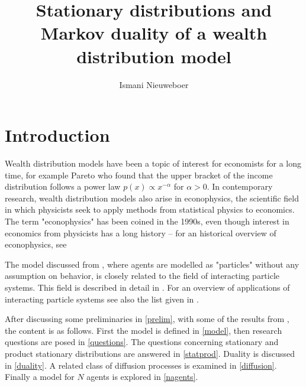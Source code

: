 \documentclass{article}
\title{Stationary distributions and Markov duality of a wealth distribution model}
\author{Ismani Nieuweboer}
\begin{document}
\maketitle













\section*{Introduction}
Wealth distribution models have been a topic of interest for economists for a long time, for example Pareto who found that the upper bracket of the income distribution follows a power law $p(x) \propto x^{-\alpha}$ for $\alpha > 0$. In contemporary research, wealth distribution models also arise in econophysics, the scientific field in which physicists seek to apply methods from statistical physics to economics. The term "econophysics" has been coined in the 1990s, even though interest in economics from physicists has a long history -- for an historical overview of econophysics, see \cite{2008arXiv0802.1416D, 2011arXiv1108.0977S}

The model discussed from \cite{cirillo2014duality}, where agents are modelled as "particles" without any assumption on behavior, is closely related to the field of interacting particle systems. This field is described in detail in \cite{liggett2012interacting, liggett2013stochastic}. For an overview of applications of interacting particle systems see also the list given in \cite{frankredig2014}.

After discussing some preliminaries in \autoref{prelim}, with some of the results from \cite{frankredig2014}, the content is as follows. First the model is defined in \autoref{model}, then research questions are posed in \autoref{questions}. The questions concerning stationary and product stationary distributions are answered in \autoref{statprod}. Duality is discussed in \autoref{duality}. A related class of diffusion processes is examined in \autoref{diffusion}. Finally a model for $N$ agents is explored in \autoref{nagents}.
\end{document}
